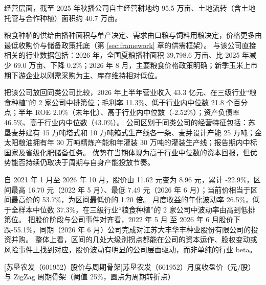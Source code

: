  经营层面，截至 2025 年秋播公司自主经营耕地约 95.5 万亩、土地流转（含土地托管与合作种植）面积约 40.7 万亩。

 粮食种植的供给由播种面积与单产决定、需求由口粮与饲料用粮决定，价格更多由最低收购价与储备政策托底（第 \ref{sec:framework} 章的供需框架）。 与该公司直接相关的行业数据包括：2026 年，全国夏粮播种面积 39,798.6 万亩、比 2025 年减少 69.0 万亩、下降 0.2\%；2026 年 8 月，主要粮食价格政策明确；新季玉米上市期下游企业以刚需采购为主、库存维持相对低位。

 把该公司放回同类公司比较，2026 年上半年营业收入 43.3 亿元、在三级行业“粮食种植”的 2 家公司中排第位；毛利率 11.3\%、低于行业内中位数 21.8 个百分点；半年 ROE 2.0\%（未年化）、高于行业内中位数（-2.52\%）；资产负债率 46.5\%、高于行业内中位数（43.0\%）。 公司区别于同类公司的经营特征包括：苏垦麦芽建有 15 万吨塔式和 10 万吨箱式生产线各一条、麦芽设计产能 25 万吨；金太阳粮油拥有年 30 万吨精炼产能和年灌装 30 万吨的灌装生产线；报告期内中标国家及省级化肥储备任务。 优势在当期体现为高于行业中位数的资本回报，但优势能否持续仍取决于周期与自身产能投放节奏。

 自 2021 年 1 月至 2026 年 10 月，股价由 11.62 元变为 8.96 元，累计 -22.9\%，区间最高 16.70 元（2022 年 5 月）、最低 7.49 元（2026 年 6 月）；当前价相当于区间最高价的 53.7\%，为区间最低价的 1.20 倍。 月度收益的年化波动率 26.5\%，低于全样本中位数 37.3\%，在三级行业“粮食种植”的 2 家公司中波动率由高到低排第位。 把股价阶段与公司事件对齐看，2022 年 5 月 至 2026 年 6 月股价下跌-55.1\%，同期（2026 年 6 月）公司完成对江苏大丰华丰种业股份有限公司的投资并购。 整体上看，区间的几处大级别拐点都能在公司的资本运作、股权变动或风险事件上找到对应，股价波动有明显的公司层面驱动，而非单纯的行业 beta。

\begin{center}
\begin{minipage}{\textwidth}\centering
{}

[苏垦农发（601952）股价与周期骨架]{苏垦农发（601952）月度收盘价（元/股）与 ZigZag 周期骨架（阈值 25\%，圆点为周期转折点）}
\end{minipage}
\end{center}

